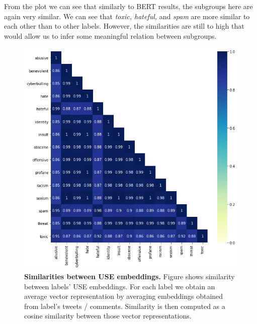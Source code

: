 \documentclass[fleqn,moreauthors,10pt]{ds_report}
\begin{document}
From the plot we can see that similarly to BERT results, the subgroups here are again very similar. We can see that \textit{toxic, hateful,} and \textit{spam} are more similar to each other than to other labels. However, the similarities are still to high that would allow us to infer some meaningful relation between subgroups.

\begin{figure}[htb]\centering
	\includegraphics[width=0.9\linewidth]{use_sim.png}
	\caption{\textbf{Similarities between USE embeddings.} Figure shows similarity between labels' USE embeddings. For each label we obtain an average vector representation by averaging embeddings obtained from label's tweets / comments. Similarity is then computed as a cosine similarity between those vector representations.}
	\label{fig:use_sim}
\end{figure}


\end{document}
